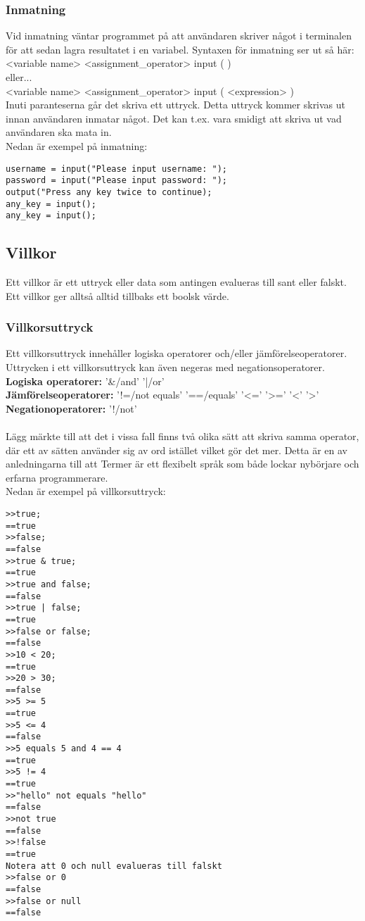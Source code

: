 \documentclass{TDP003mall}
\begin{document}
\subsubsection{Inmatning}
Vid inmatning väntar programmet på att användaren skriver något i terminalen för att sedan lagra resultatet i en variabel. Syntaxen för inmatning ser ut så här:
\\
<variable name> <assignment\_operator> input ( )\\
eller...\\
<variable name> <assignment\_operator> input ( <expression> )
\\
Inuti paranteserna går det skriva ett uttryck. Detta uttryck kommer skrivas ut innan användaren inmatar något. Det kan t.ex. vara smidigt att skriva ut vad användaren ska mata in.\\
Nedan är exempel på inmatning:
\begin{lstlisting}
username = input("Please input username: ");
password = input("Please input password: ");
output("Press any key twice to continue);
any_key = input();
any_key = input();
\end{lstlisting}
\newpage

\subsection{Villkor}
Ett villkor är ett uttryck eller data som antingen evalueras till sant eller falskt. Ett villkor ger alltså alltid tillbaks ett boolsk värde.
\subsubsection{Villkorsuttryck}
Ett villkorsuttryck innehåller logiska operatorer och/eller jämförelseoperatorer. Uttrycken i ett villkorsuttryck kan även negeras med negationsoperatorer.
\\
\textbf{Logiska operatorer:} '\&/and' '|/or'
\\
\textbf{Jämförelseoperatorer:} '!=/not equals' '==/equals' '<=' '>=' '<' '>'
\\
\textbf{Negationoperatorer:} '!/not'
\\\\
Lägg märkte till att det i vissa fall finns två olika sätt att skriva samma operator, där ett av sätten använder sig av ord istället vilket gör det mer. Detta är en av anledningarna till att Termer är ett flexibelt språk som både lockar nybörjare och erfarna programmerare.
\\
Nedan är exempel på villkorsuttryck:
\begin{lstlisting}
>>true;
==true
>>false;
==false
>>true & true;
==true
>>true and false;
==false
>>true | false;
==true
>>false or false;
==false
>>10 < 20;
==true
>>20 > 30;
==false
>>5 >= 5
==true
>>5 <= 4
==false
>>5 equals 5 and 4 == 4
==true
>>5 != 4
==true
>>"hello" not equals "hello"
==false
>>not true
==false
>>!false
==true
Notera att 0 och null evalueras till falskt
>>false or 0
==false
>>false or null
==false
\end{lstlisting}
\end{document}

